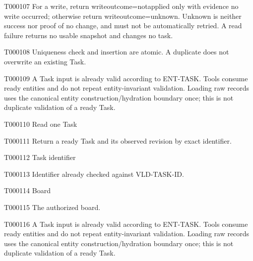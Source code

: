 \documentclass[11pt,a4paper]{article}
\begin{document}
\begin{atlasparagraph}{T000107}
For a write, return write\AtlasCharUnderscore{}outcome=not\AtlasCharUnderscore{}applied only with evidence no write occurred; otherwise return write\AtlasCharUnderscore{}outcome=unknown. Unknown is neither success nor proof of no change, and must not be automatically retried. A read failure returns no usable snapshot and changes no task.
\end{atlasparagraph}
\begin{atlasparagraph}{T000108}
Uniqueness check and insertion are atomic. A duplicate does not overwrite an existing Task.
\end{atlasparagraph}
\begin{atlasparagraph}{T000109}
A Task input is already valid according to ENT-TASK. Tools consume ready entities and do not repeat entity-invariant validation. Loading raw records uses the canonical entity construction/hydration boundary once; this is not duplicate validation of a ready Task.
\end{atlasparagraph}
\begin{atlastext}{T000110}
Read one Task
\end{atlastext}
\begin{atlasparagraph}{T000111}
Return a ready Task and its observed revision by exact identifier.
\end{atlasparagraph}
\begin{atlastext}{T000112}
Task identifier
\end{atlastext}
\begin{atlasparagraph}{T000113}
Identifier already checked against VLD-TASK-ID.
\end{atlasparagraph}
\begin{atlastext}{T000114}
Board
\end{atlastext}
\begin{atlasparagraph}{T000115}
The authorized board.
\end{atlasparagraph}
\begin{atlasparagraph}{T000116}
A Task input is already valid according to ENT-TASK. Tools consume ready entities and do not repeat entity-invariant validation. Loading raw records uses the canonical entity construction/hydration boundary once; this is not duplicate validation of a ready Task.
\end{atlasparagraph}
\end{document}
